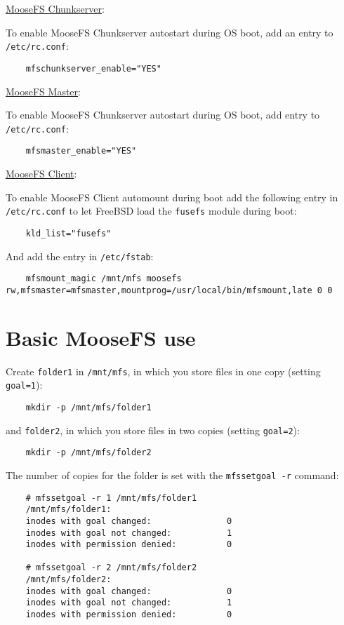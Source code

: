 \documentclass[a4paper,11pt,english]{report}
\def\code#1{\texttt{#1}}
\begin{document}
		\underline{MooseFS Chunkserver}:
		
		To enable MooseFS Chunkserver autostart during OS boot, add an entry to \code{/etc/rc.conf}:
		\begin{lstlisting}
	mfschunkserver_enable="YES"
		\end{lstlisting}
		
		\underline{MooseFS Master}:
		
		To enable MooseFS Chunkserver autostart during OS boot, add entry to \code{/etc/rc.conf}:
		\begin{lstlisting}
	mfsmaster_enable="YES"
		\end{lstlisting}

		\underline{MooseFS Client}:
		
		To enable MooseFS Client automount during boot add the following entry in \code{/etc/rc.conf} to let FreeBSD load the \code{fusefs} module during boot:
		\begin{lstlisting}
	kld_list="fusefs"
		\end{lstlisting}
		
		And add the entry in \code{/etc/fstab}:
		\begin{lstlisting}
	mfsmount_magic /mnt/mfs moosefs rw,mfsmaster=mfsmaster,mountprog=/usr/local/bin/mfsmount,late 0 0 
		\end{lstlisting}

		
		\newpage
	
		\section{Basic MooseFS use}
		Create \code{folder1} in \code{/mnt/mfs}, in which you store files in one copy (setting \code{goal=1}):
		\begin{lstlisting}
	mkdir -p /mnt/mfs/folder1
		\end{lstlisting}

and \code{folder2}, in which you store files in two copies (setting \code{goal=2}):
		\begin{lstlisting}
	mkdir -p /mnt/mfs/folder2
		\end{lstlisting}


		The number of copies for the folder is set with the \code{mfssetgoal -r} command:
		\begin{lstlisting}
	# mfssetgoal -r 1 /mnt/mfs/folder1
	/mnt/mfs/folder1:
	inodes with goal changed:				0
	inodes with goal not changed:			1
	inodes with permission denied:			0

	# mfssetgoal -r 2 /mnt/mfs/folder2
	/mnt/mfs/folder2:
	inodes with goal changed:				0
	inodes with goal not changed:			1
	inodes with permission denied:			0
		\end{lstlisting}
\end{document}
